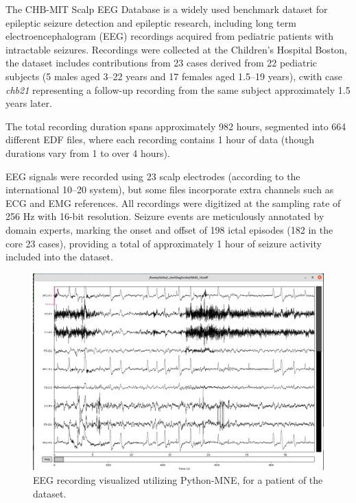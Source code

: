\documentclass{article}
\begin{document}
		The CHB-MIT Scalp EEG Database\cite{chbmitDataset} is a 
		widely used benchmark dataset for epileptic seizure 
		detection and epileptic research, including long term electroencephalogram (EEG) 
		recordings acquired from pediatric patients with intractable seizures. 
		Recordings were collected at the Children's Hospital Boston, 
		the dataset includes contributions from 23 cases derived from 22 pediatric subjects 
		(5 males aged 3--22 years and 17 females aged 1.5--19 years), 
		cwith case \textit{chb21} representing a follow-up recording from the same subject approximately 1.5 years later. 

		The total recording duration spans approximately 982 hours, 
		segmented into 664 different EDF files, where each recording contains 1 hour of data (though durations vary from 1 to over 4 hours). 

		EEG signals were recorded using 23 scalp electrodes (according to the international 10--20 system), 
		but some files incorporate extra channels such as ECG and EMG references. 
		All recordings were digitized at the sampling rate of 256 Hz with 16-bit resolution. 
		Seizure events are meticulously annotated by domain experts, 
		marking the onset and offset of 198 ictal episodes (182 in the core 23 cases), 
		providing a total of approximately 1 hour of seizure activity included into the dataset. 

			\begin{figure}[h]
			    \centering
			    \includegraphics[width=1.1\textwidth]{edf_rec.png}
			    \caption{EEG recording visualized utilizing Python-MNE, for a patient of the dataset.}
			    \label{}
			\end{figure}
\end{document}
